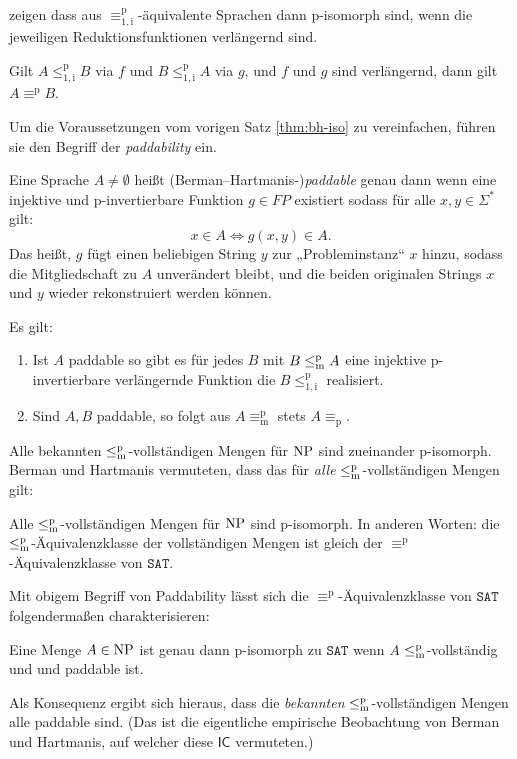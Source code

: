 \textcite{hartmanis_isomorphisms_1976} zeigen dass aus $\equiv_\mathrm{1,i}^\mathrm{p}$-äquivalente Sprachen dann p-isomorph sind, wenn die jeweiligen Reduktionsfunktionen verlängernd sind.
\begin{theorem}\label{thm:bh-iso}
    Gilt $A\leq_\mathrm{1,i}^\mathrm{p} B$ via $f$ und $B\leq_\mathrm{1,i}^\mathrm{p} A$ via $g$, und $f$ und $g$ sind verlängernd, dann gilt $A\equiv^\mathrm{p}B$.
\end{theorem}
Um die Voraussetzungen vom vorigen Satz \ref{thm:bh-iso} zu vereinfachen, führen sie den Begriff der \emph{paddability} ein.
\begin{definition}
    Eine Sprache $A\neq\emptyset$ heißt (Berman–Hartmanis-)\emph{paddable} genau dann wenn eine injektive und p-invertierbare Funktion $g\in FP$ existiert sodass für alle $x,y\in\Sigma^*$ gilt:
    \[ x\in A \iff g(x,y)\in A. \]
    Das heißt, $g$ fügt einen beliebigen String $y$ zur „Probleminstanz“ $x$ hinzu, sodass die Mitgliedschaft zu $A$ unverändert bleibt, und die beiden originalen Strings $x$ und $y$ wieder rekonstruiert werden können. 
\end{definition}
Es gilt:
\begin{theorem}
    \begin{enumerate}
        \item Ist $A$ paddable so gibt es für jedes $B$ mit $B\leq_\mathrm{m}^\mathrm{p} A$ eine injektive p-invertierbare verlängernde Funktion die $B\leq_\mathrm{1,i}^\mathrm{p}$ realisiert.
        \item Sind $A, B$ paddable, so folgt aus $A\equiv_\mathrm{m}^\mathrm{p}$ stets $A\equiv_\mathrm{p}$.
    \end{enumerate}
\end{theorem}
Alle bekannten $\leq_\mathrm{m}^\mathrm{p}$-vollständigen Mengen für $\mathrm{NP}$ sind zueinander p-isomorph. 
Berman und Hartmanis vermuteten, dass das für \emph{alle} $\leq_\mathrm{m}^\mathrm{p}$-vollständigen Mengen gilt:
\begin{conjecture}[$\mathsf{IC}$]
    Alle $\leq_\mathrm{m}^\mathrm{p}$-vollständigen Mengen für $\mathrm{NP}$ sind p-isomorph.
    In anderen Worten: die $\leq_\mathrm{m}^\mathrm{p}$-Äquivalenzklasse der vollständigen Mengen ist gleich der  $\equiv^\mathrm{p}$-Äquivalenzklasse von $\mathtt{SAT}$.
\end{conjecture}
Mit obigem Begriff von Paddability lässt sich die $\equiv^\mathrm{p}$-Äquivalenzklasse von $\mathtt{SAT}$ folgendermaßen charakterisieren:
\begin{theorem}
    Eine Menge $A\in\mathrm{NP}$ ist genau dann p-isomorph zu $\mathtt{SAT}$ wenn $A$ $\leq_\mathrm{m}^\mathrm{p}$-vollständig und und paddable ist.
\end{theorem}
Als Konsequenz ergibt sich hieraus, dass die \emph{bekannten} $\leq_\mathrm{m}^\mathrm{p}$-vollständigen Mengen alle paddable sind. (Das ist die eigentliche empirische Beobachtung von Berman und Hartmanis, auf welcher diese $\mathsf{IC}$ vermuteten.)

